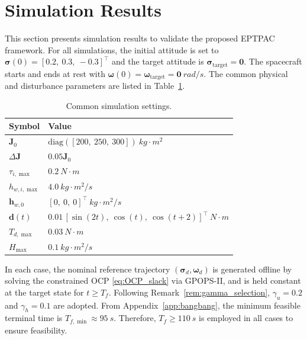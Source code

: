 \documentclass[journal]{new-aiaa}
\begin{document}

\section{Simulation Results}
\label{section:simulation}

This section presents simulation results to validate the proposed EPTPAC framework.
For all simulations, the initial attitude is set to $\boldsymbol{\sigma}(0)=[0.2,\ 0.3,\ -0.3]^\top$ and the target attitude is $\boldsymbol{\sigma}_{\mathrm{target}}=\boldsymbol{0}$. The spacecraft starts and ends at rest with $\boldsymbol{\omega}(0)=\boldsymbol{\omega}_{\mathrm{target}}=\boldsymbol{0}~\si{rad/s}$.
The common physical and disturbance parameters are listed in Table~\ref{tab:sim_setup_all}.

\begin{table}[ht]
\centering
\caption{Common simulation settings.}
\label{tab:sim_setup_all}
\begin{tabular}{@{}l l@{}}
\toprule
\textbf{Symbol} & \textbf{Value} \\
\midrule
$\boldsymbol{J}_0$ &
$\mathrm{diag}([200,\ 250,\ 300])~\si{kg\cdot m^2}$ \\
$\Delta\boldsymbol{J}$ &
$0.05 \boldsymbol{J}_0 $ \\
$\tau_{i,\max}$ &
$\SI{0.2}{N\cdot m}$ \\
$h_{w,i,\max}$ &
$\SI{4.0}{kg\cdot m^2/s}$ \\
$\boldsymbol{h}_{w,0}$ &
$[0,\ 0,\ 0]^\top~\si{kg\cdot m^2/s}$ \\
$\boldsymbol{d}(t)$ &
$0.01\,[\sin(2t),\ \cos(t),\ \cos(t+2)]^\top~\si{N\cdot m}$ \\
$T_{d,\max}$ &
$\SI{0.03}{N\cdot m}$ \\
$H_{\max}$ &
$\SI{0.1}{kg\cdot m^2/s}$ \\\bottomrule
\end{tabular}
\end{table}

In each case, the nominal reference trajectory $(\boldsymbol{\sigma}_d,\boldsymbol{\omega}_d)$ is generated offline by solving the constrained OCP \eqref{eq:OCP_slack} via GPOPS-II, and is held constant at the target state for $t\ge T_f$.
Following Remark~\ref{rem:gamma_selection}, $\gamma_u=0.2$ and $\gamma_h=0.1$ are adopted.
From Appendix~\ref{app:bangbang}, the minimum feasible terminal time is $T_{f,\min}\approx\SI{95}{s}$. Therefore, $T_f\ge\SI{110}{s}$ is employed in all cases to ensure feasibility.
\end{document}
